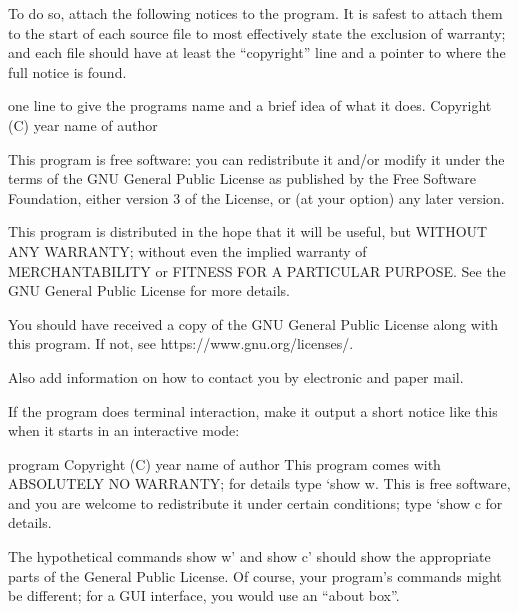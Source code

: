 \documentclass[letterpaper,10pt,english]{sphinxmanual}
\begin{document}
\sphinxAtStartPar
To do so, attach the following notices to the program. It is safest to attach them to the start of each source file to most effectively state the exclusion of warranty; and each file should have at least the “copyright” line and a pointer to where the full notice is found.

\begin{sphinxVerbatim}[commandchars=\\\{\}]
\PYGZlt{}one line to give the program\PYGZsq{}s name and a brief idea of what it does.\PYGZgt{}
Copyright (C) \PYGZlt{}year\PYGZgt{}  \PYGZlt{}name of author\PYGZgt{}

This program is free software: you can redistribute it and/or modify
it under the terms of the GNU General Public License as published by
the Free Software Foundation, either version 3 of the License, or
(at your option) any later version.

This program is distributed in the hope that it will be useful,
but WITHOUT ANY WARRANTY; without even the implied warranty of
MERCHANTABILITY or FITNESS FOR A PARTICULAR PURPOSE. See the
GNU General Public License for more details.

You should have received a copy of the GNU General Public License
along with this program. If not, see \PYGZlt{}https://www.gnu.org/licenses/\PYGZgt{}.
\end{sphinxVerbatim}

\sphinxAtStartPar
Also add information on how to contact you by electronic and paper mail.

\sphinxAtStartPar
If the program does terminal interaction, make it output a short notice like this when it starts in an interactive mode:

\begin{sphinxVerbatim}[commandchars=\\\{\}]
\PYGZlt{}program\PYGZgt{} Copyright (C) \PYGZlt{}year\PYGZgt{} \PYGZlt{}name of author\PYGZgt{}
This program comes with ABSOLUTELY NO WARRANTY; for details type `show w\PYGZsq{}.
This is free software, and you are welcome to redistribute it
under certain conditions; type `show c\PYGZsq{} for details.
\end{sphinxVerbatim}

\sphinxAtStartPar
The hypothetical commands {\color{red}\bfseries{}\textasciigrave{}}show w’ and {\color{red}\bfseries{}\textasciigrave{}}show c’ should show the appropriate parts of the General Public License. Of course, your program’s commands might be different; for a GUI interface, you would use an “about box”.
\end{document}
